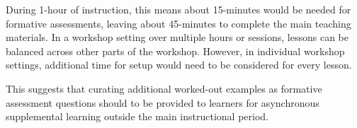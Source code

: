 \documentclass[040-assessment.tex]{subfiles}
\begin{document}
    During 1-hour of instruction, this means about 15-minutes would be needed for formative assessments,
    leaving about 45-minutes to complete the main teaching materials.
    In a workshop setting over multiple hours or sessions, lessons can be balanced across other parts of the workshop.
    However, in individual workshop settings, additional time for setup would need to be
    considered for every lesson.

    This suggests that curating additional worked-out examples as formative assessment questions
    should to be provided to learners
    for asynchronous supplemental learning outside the main instructional period.
\end{document}
